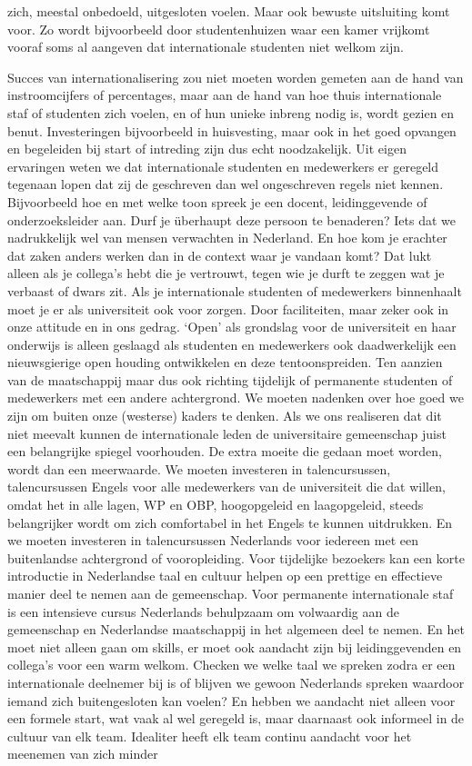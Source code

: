 \documentclass{jote-book}
\begin{document}
zich, meestal onbedoeld, uitgesloten voelen. Maar ook bewuste uitsluiting komt voor. Zo wordt bijvoorbeeld door studentenhuizen waar een kamer vrijkomt vooraf soms al aangeven dat internationale studenten niet welkom zijn.



	Succes van internationalisering zou niet moeten worden gemeten aan de hand van instroomcijfers of percentages, maar aan de hand van hoe thuis internationale staf of studenten zich voelen, en of hun unieke inbreng nodig is, wordt gezien en benut. Investeringen bijvoorbeeld in huisvesting, maar ook in het goed opvangen en begeleiden bij start of intreding zijn dus echt noodzakelijk. Uit eigen ervaringen weten we dat internationale studenten en medewerkers er geregeld tegenaan lopen dat zij de geschreven dan wel ongeschreven regels niet kennen. Bijvoorbeeld hoe en met welke toon spreek je een docent, leidinggevende of onderzoeksleider aan. Durf je überhaupt deze persoon te benaderen? Iets dat we nadrukkelijk wel van mensen verwachten in Nederland. En hoe kom je erachter dat zaken anders werken dan in de context waar je vandaan komt? Dat lukt alleen als je collega's hebt die je vertrouwt, tegen wie je durft te zeggen wat je verbaast of dwars zit. Als je internationale studenten of medewerkers binnenhaalt moet je er als universiteit ook voor zorgen. Door faciliteiten, maar zeker ook in onze attitude en in ons gedrag. ‘Open' als grondslag voor de universiteit en haar onderwijs is alleen geslaagd als studenten en medewerkers ook daadwerkelijk een nieuwsgierige open houding ontwikkelen en deze tentoonspreiden. Ten aanzien van de maatschappij maar dus ook richting tijdelijk of permanente studenten of medewerkers met een andere achtergrond. We moeten nadenken over hoe goed we zijn om buiten onze (westerse) kaders te denken. Als we ons realiseren dat dit niet meevalt kunnen de internationale leden de universitaire gemeenschap juist een belangrijke spiegel voorhouden. De extra moeite die gedaan moet worden, wordt dan een meerwaarde. We moeten investeren in talencursussen, talencursussen Engels voor alle medewerkers van de universiteit die dat willen, omdat het in alle lagen, WP en OBP, hoogopgeleid en laagopgeleid, steeds belangrijker wordt om zich comfortabel in het Engels te kunnen uitdrukken. En we moeten investeren in talencursussen Nederlands voor iedereen met een buitenlandse achtergrond of vooropleiding. Voor tijdelijke bezoekers kan een korte introductie in Nederlandse taal en cultuur helpen op een prettige en effectieve manier deel te nemen aan de gemeenschap. Voor permanente internationale staf is een intensieve cursus Nederlands behulpzaam om volwaardig aan de gemeenschap en Nederlandse maatschappij in het algemeen deel te nemen. En het moet niet alleen gaan om skills, er moet ook aandacht zijn bij leidinggevenden en collega's voor een warm welkom. Checken we welke taal we spreken zodra er een internationale deelnemer bij is of blijven we gewoon Nederlands spreken waardoor iemand zich buitengesloten kan voelen? En hebben we aandacht niet alleen voor een formele start, wat vaak al wel geregeld is, maar daarnaast ook informeel in de cultuur van elk team. Idealiter heeft elk team continu aandacht voor het meenemen van zich minder 
\end{document}
